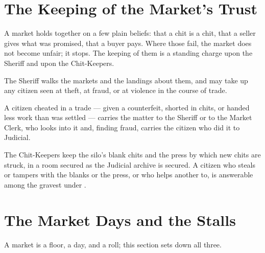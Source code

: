 \section{The Keeping of the Market's Trust}
\label{sec:commerce:keeping-of-the-markets-trust}

A market holds together on a few plain beliefs: that a chit is a chit, that a seller gives what was promised, that a buyer pays. Where those fail, the market does not become unfair; it stops. The keeping of them is a standing charge upon the Sheriff and upon the Chit-Keepers.

\begin{clauses}
\item The Sheriff walks the markets and the landings about them, and may take up any citizen seen at theft, at fraud, or at violence in the course of trade.
\item A citizen cheated in a trade --- given a counterfeit, shorted in chits, or handed less work than was settled --- carries the matter to the Sheriff or to the Market Clerk, who looks into it and, finding fraud, carries the citizen who did it to Judicial.
\item The Chit-Keepers keep the silo's blank chits and the press by which new chits are struck, in a room secured as the Judicial archive is secured. A citizen who steals or tampers with the blanks or the press, or who helps another to, is answerable among the gravest under .
\end{clauses}

\section{The Market Days and the Stalls}
\label{sec:commerce:market-days-and-the-stalls}

A market is a floor, a day, and a roll; this section sets down all three.

